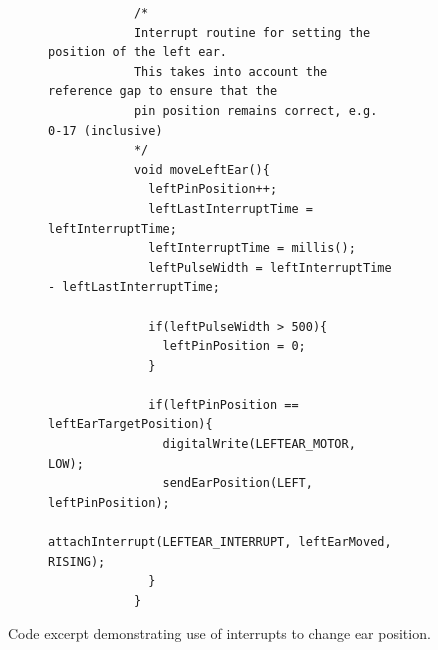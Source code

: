 \documentclass[12pt, a4paper]{article}
\begin{document}
\begin{appendices}
\begin{figure}[H]
\begin{subfigure}{0.95\textwidth}
\begin{verbatim}
			/*
			Interrupt routine for setting the position of the left ear.
			This takes into account the reference gap to ensure that the
			pin position remains correct, e.g. 0-17 (inclusive)
			*/
			void moveLeftEar(){
			  leftPinPosition++;
			  leftLastInterruptTime = leftInterruptTime;
			  leftInterruptTime = millis();
			  leftPulseWidth = leftInterruptTime - leftLastInterruptTime;
			
			  if(leftPulseWidth > 500){
			    leftPinPosition = 0;
			  }
			
			  if(leftPinPosition == leftEarTargetPosition){
			    digitalWrite(LEFTEAR_MOTOR, LOW);
			    sendEarPosition(LEFT, leftPinPosition);
			    attachInterrupt(LEFTEAR_INTERRUPT, leftEarMoved, RISING); 
			  }
			}
		\end{verbatim}
		\end{subfigure}
		\caption[Example of Arduino ISR code]{Code excerpt demonstrating use of interrupts to change ear position.}
		\label{fig:isrcode}
	\end{figure}

\newpage


\end{appendices}
\end{document}

